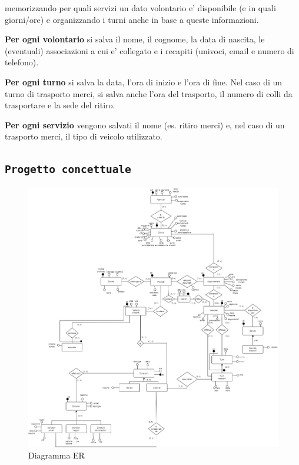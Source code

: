 \documentclass[]{article}
\begin{document}
memorizzando per quali servizi un dato volontario e' disponibile (e in
quali giorni/ore) e organizzando i turni anche in base a queste
informazioni.

\textbf{Per ogni volontario} si salva il nome, il cognome, la data di
nascita, le (eventuali) associazioni a cui e' collegato e i recapiti
(univoci, email e numero di telefono).

\textbf{Per ogni turno} si salva la data, l'ora di inizio e l'ora di
fine. Nel caso di un turno di trasporto merci, si salva anche l'ora del
trasporto, il numero di colli da trasportare e la sede del ritiro.

\textbf{Per ogni servizio} vengono salvati il nome (es. ritiro merci) e,
nel caso di un trasporto merci, il tipo di veicolo utilizzato.

\hypertarget{progetto-concettuale}{%
\subsection{\texorpdfstring{\texttt{Progetto\ concettuale}}{Progetto concettuale}}\label{progetto-concettuale}}

\begin{figure}
\centering
\includegraphics{media/social_market_v2.drawio.png}
\caption{Diagramma ER}
\end{figure}
\end{document}
